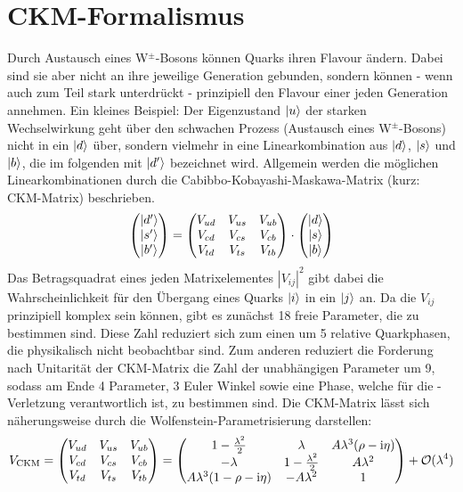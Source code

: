 \section{CKM-Formalismus}
Durch Austausch eines W$^{\pm}$-Bosons können Quarks ihren Flavour ändern. Dabei sind sie aber nicht an ihre jeweilige Generation gebunden, sondern können - wenn auch zum Teil stark unterdrückt - prinzipiell den Flavour einer jeden Generation annehmen. Ein kleines Beispiel: Der Eigenzustand $\Ket{u}$ der starken Wechselwirkung geht über den schwachen Prozess (Austausch eines W$^{\pm}$-Bosons) nicht in ein $\Ket{d}$ über, sondern vielmehr in eine Linearkombination aus $\Ket{d}$, $\Ket{s}$ und $\Ket{b}$, die im folgenden mit $\Ket{d'}$ bezeichnet wird. Allgemein werden die möglichen Linearkombinationen durch die Cabibbo-Kobayashi-Maskawa-Matrix (kurz: CKM-Matrix) beschrieben.
\begin{align}
\begin{pmatrix}
\Ket{d'} \\ \Ket{s'} \\ \Ket{b'}
\end{pmatrix}
=
\begin{pmatrix}
V_{ud} & V_{us} & V_{ub} \\
V_{cd} & V_{cs} & V_{cb} \\
V_{td} & V_{ts} & V_{tb} \\
\end{pmatrix}
\cdot
\begin{pmatrix}
\Ket{d} \\ \Ket{s} \\ \Ket{b}
\end{pmatrix}
\end{align}
Das Betragsquadrat eines jeden Matrixelementes $|V_{ij}|^2$ gibt dabei die Wahrscheinlichkeit für den Übergang eines Quarks $\Ket{i}$ in ein $\Ket{j}$ an. Da die $V_{ij}$ prinzipiell komplex sein können, gibt es zunächst 18 freie Parameter, die zu bestimmen sind. Diese Zahl reduziert sich zum einen um 5 relative Quarkphasen, die physikalisch nicht beobachtbar sind. Zum anderen reduziert die Forderung nach Unitarität der CKM-Matrix die Zahl der unabhängigen Parameter um 9, sodass am Ende 4 Parameter, 3 Euler Winkel sowie eine Phase, welche für die \CP-Verletzung verantwortlich ist, zu bestimmen sind. Die CKM-Matrix lässt sich näherungsweise durch die Wolfenstein-Parametrisierung darstellen:
\begin{align}
V_{\text{CKM}}=
\begin{pmatrix}
V_{ud} & V_{us} & V_{ub} \\
V_{cd} & V_{cs} & V_{cb} \\
V_{td} & V_{ts} & V_{tb} \\
\end{pmatrix}
=
\begin{pmatrix}
1-\frac{\lambda^2}{2} & \lambda & A\lambda^3(\rho-\mathrm{i}\eta) \\
-\lambda & 1-\frac{\lambda^2}{2} & A\lambda^2 \\
A\lambda^3(1-\rho-\mathrm{i}\eta) & -A\lambda^2 & 1
\end{pmatrix}
+ \mathcal{O}(\lambda^4)
\end{align}
